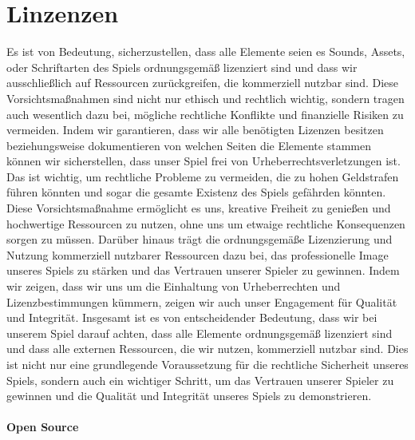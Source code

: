 
\chapter{Linzenzen}\label{ch:lizenzen}
\renewcommand{\kapitelautor}{Autor: Nils Hubmann}

%
Es ist von Bedeutung, sicherzustellen, dass alle Elemente seien es Sounds, Assets, oder Schriftarten des Spiels ordnungsgemäß lizenziert sind und dass wir ausschließlich auf Ressourcen zurückgreifen, die kommerziell nutzbar sind.
Diese Vorsichtsmaßnahmen sind nicht nur ethisch und rechtlich wichtig, sondern tragen auch wesentlich dazu bei, mögliche rechtliche Konflikte und finanzielle Risiken zu vermeiden.
Indem wir garantieren, dass wir alle benötigten Lizenzen besitzen beziehungsweise dokumentieren von welchen Seiten die Elemente stammen können wir sicherstellen, dass unser Spiel frei von Urheberrechtsverletzungen ist.
Das ist wichtig, um rechtliche Probleme zu vermeiden, die zu hohen Geldstrafen führen könnten und sogar die gesamte Existenz des Spiels gefährden könnten.
Diese Vorsichtsmaßnahme ermöglicht es uns, kreative Freiheit zu genießen und hochwertige Ressourcen zu nutzen, ohne uns um etwaige rechtliche Konsequenzen sorgen zu müssen.
Darüber hinaus trägt die ordnungsgemäße Lizenzierung und Nutzung kommerziell nutzbarer Ressourcen dazu bei, das professionelle Image unseres Spiels zu stärken und das Vertrauen unserer Spieler zu gewinnen.
Indem wir zeigen, dass wir uns um die Einhaltung von Urheberrechten und Lizenzbestimmungen kümmern, zeigen wir auch unser Engagement für Qualität und Integrität.
Insgesamt ist es von entscheidender Bedeutung, dass wir bei unserem Spiel darauf achten, dass alle Elemente ordnungsgemäß lizenziert sind und dass alle externen Ressourcen, die wir nutzen, kommerziell nutzbar sind.
Dies ist nicht nur eine grundlegende Voraussetzung für die rechtliche Sicherheit unseres Spiels, sondern auch ein wichtiger Schritt, um das Vertrauen unserer Spieler zu gewinnen und die Qualität und Integrität unseres Spiels zu demonstrieren.
%
\subsubsection{Open Source}\label{subsubsec:Open-Source}
%

